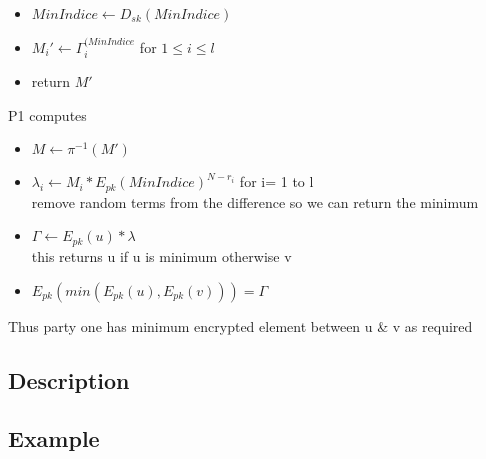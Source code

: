 \documentclass[10pt]{article} %
\begin{document}
\begin{itemize}
	\item $MinIndice \gets D_{sk}(MinIndice)$
	\item $M_i' \gets \Gamma_i^{(MinIndice}$ for $1\le i \le l$
	\item return $M'$
\end{itemize}

P1 computes

\begin{itemize}
\item $M \gets \pi^{-1}(M')$
\item $\lambda _i \gets M_i * E_{pk}(MinIndice)^{N-r_i}$ for i= 1 to l
\\remove random terms from the difference so we can return the minimum
\item $\Gamma \gets E_{pk}(u)*\lambda$
\\this returns u if u is minimum otherwise v
\item $E_{pk}(min(E_{pk}(u),E_{pk}(v))) = \Gamma$
\end{itemize}

Thus party one has minimum encrypted element between u \& v as required
\subsection*{\textbf{Description}}

\subsection*{\textbf{Example}}
\end{document}
